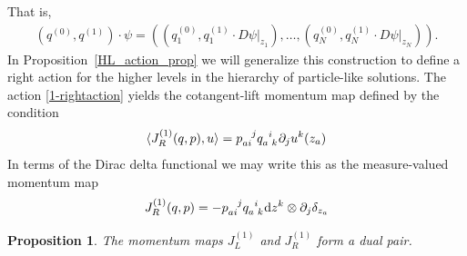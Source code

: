 \documentclass[12pt]{amsart}
\newcommand{\dz}{\ensuremath{\textrm{d}z}}
\newtheorem{prop}[thm]{Proposition}
\begin{document}
	 That is, 
 \begin{align}
	 (q^{(0)}, q^{(1)}) \cdot \psi = \left( \left(q_1^{(0)}, q_1^{(1)} \cdot D\psi|_{z_1}\right), \ldots, \left(q_N^{(0)}, q_N^{(1)} \cdot D\psi|_{z_N}\right)\right). \label{1-rightaction}
\end{align}
In Proposition~\ref{HL_action_prop} we will generalize this construction to define a right action for the higher levels in the hierarchy of particle-like solutions.
  The action \eqref{1-rightaction} yields the cotangent-lift momentum map defined by the condition
  \begin{align*}
    \langle J_R^{(1)}(q,p) , u \rangle = p\indices{_a_i^j} q\indices{_a^i_k} \partial_j u^k(z_a)
  \end{align*}
  In terms of the Dirac delta functional we may write this as the measure-valued momentum map
  \begin{equation}\label{eq:JR1}
    J_R^{(1)}(q,p) = - p\indices{_a_i^j} q\indices{_a^i_k} \dz^k \otimes \partial_j \delta_{z_a}
  \end{equation}
  \begin{prop}\label{prop:J1-dual-pair}
    The momentum maps $J_L^{(1)}$ and $J_R^{(1)}$ form a dual pair.
  \end{prop}
\end{document}
